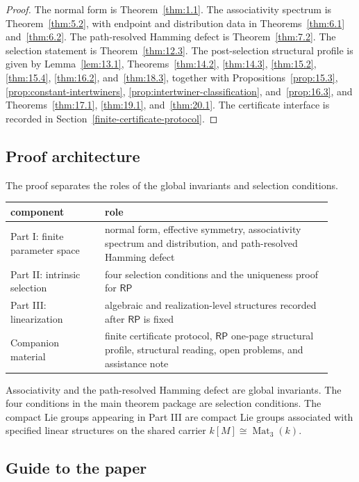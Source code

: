 \documentclass[11pt]{article}
\theoremstyle{definition}
\newcommand{\RP}{\mathsf{RP}}
\begin{document}
\begin{proof}
The normal form is Theorem~\ref{thm:1.1}.  The associativity spectrum is Theorem~\ref{thm:5.2}, with endpoint and distribution data in
Theorems~\ref{thm:6.1} and~\ref{thm:6.2}.  The path-resolved Hamming defect is
Theorem~\ref{thm:7.2}.  The selection statement is
Theorem~\ref{thm:12.3}.  The post-selection structural profile is given by
Lemma~\ref{lem:13.1}, Theorems~\ref{thm:14.2}, \ref{thm:14.3},
\ref{thm:15.2}, \ref{thm:15.4}, \ref{thm:16.2}, and~\ref{thm:18.3},
together with Propositions~\ref{prop:15.3},
\ref{prop:constant-intertwiners}, \ref{prop:intertwiner-classification},
and~\ref{prop:16.3}, and Theorems~\ref{thm:17.1}, \ref{thm:19.1},
and~\ref{thm:20.1}.  The certificate interface is recorded in
Section~\ref{finite-certificate-protocol}.
\end{proof}

\subsection*{Proof architecture}\label{intro-proof-architecture}

The proof separates the roles of the global invariants and selection conditions.
\begin{longtable}{@{}p{0.27\linewidth}p{0.65\linewidth}@{}}
\toprule
component & role \\
\midrule
\endhead
\bottomrule
\endlastfoot
Part I: finite parameter space & normal form, effective symmetry, associativity spectrum and distribution, and path-resolved Hamming defect \\
Part II: intrinsic selection & four selection conditions and the uniqueness proof for \(\RP\) \\
Part III: linearization & algebraic and realization-level structures recorded after \(\RP\) is fixed \\
Companion material & finite certificate protocol, \(\RP\) one-page structural profile, structural reading, open problems, and assistance note \\
\end{longtable}
Associativity and the path-resolved Hamming defect are global invariants.  The four
conditions in the main theorem package are selection conditions.  The compact Lie
groups appearing in Part III are compact Lie groups associated with
specified linear structures on the shared carrier \(k[M]\cong\operatorname{Mat}_3(k)\).

\subsection*{Guide to the paper}\label{intro-guide}
\end{document}
